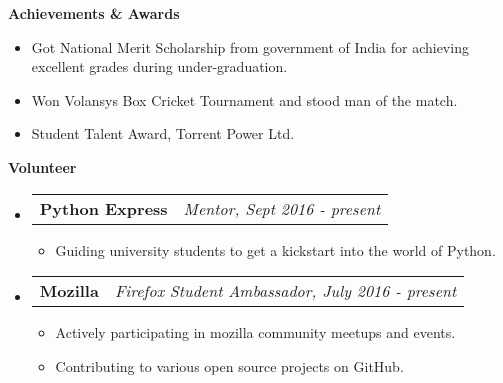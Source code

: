 \documentclass[letterpaper,10pt]{article}
\makeatletter
\newcommand{\resitem}[1]{\item #1 \vspace{-2pt}}
\newcommand{\resheading}[1]{{\large \colorbox{mygrey}{\begin{minipage}{\textwidth}{\textbf{#1 \vphantom{p\^{E}}}}\end{minipage}}}}
\newcommand{\ressubheading}[4]{
\begin{tabular*}{7.0in}{l@{\extracolsep{\fill}}r}
		\textbf{#1} & \textit{#4} \\
\end{tabular*}\vspace{-6pt}}
\makeatother
\begin{document}
\resheading{Achievements \& Awards}
\begin{itemize}
	\item Got National Merit Scholarship from government of India for achieving excellent grades during under-graduation.
	\item Won Volansys Box Cricket Tournament and stood man of the match.
	\item Student Talent Award, Torrent Power Ltd.
\end{itemize}

\resheading{Volunteer}
\begin{itemize}

\item
	\ressubheading{Python Express}{Remote}{Mentor}{Mentor, Sept 2016 - present}
	\begin{itemize}
		\resitem{Guiding university students to get a kickstart into the world of Python.}
	\end{itemize}
	
\item
	\ressubheading{Mozilla}{Remote}{Firefox Student Ambassador}{Firefox Student Ambassador, July 2016 - present}
	\begin{itemize}
		\resitem{Actively participating in mozilla community meetups and events.}
		\resitem{Contributing to various open source projects on GitHub.}
	\end{itemize}
	
\end{itemize}
\end{document}
